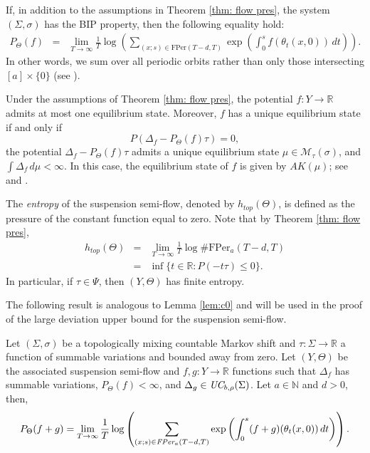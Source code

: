 \documentclass[letterpaper,11pt]{amsart}
\numberwithin{equation}{section}     %
\newcommand{\M}{\mathcal{M}}
\newcommand{\R}{\mathbb{R}}
\newcommand{\N}{\mathbb{N}}
\def\R{{\mathbb R}}
\def\N{{\mathbb N}}
\def\M{{\mathcal M}}
\def\M{\mathcal{M}}
\begin{document}
\begin{remark}\label{rmk:bipPer}

If, in addition to the assumptions in Theorem \ref{thm: flow pres}, the system $(\Sigma, \sigma)$ has the BIP property, then the following equality hold:
\begin{eqnarray*}
P_{\Theta}(f)&=&\lim_{T \to \infty} \frac{1}{T} \log \left(\sum_{(x;s)\in\text{FPer}(T-d,T)} \exp\left( \int_0^s f(\theta_t(x,0)) \,  dt \right) \right). \end{eqnarray*}
In other words, we sum over all periodic orbits rather than only those intersecting $[a] \times\{0\}$ (see \cite[Corollary 3.23]{jkl}).
\end{remark}

 Under the assumptions of Theorem \ref{thm: flow pres}, the potential 
$f:Y \to \R$ admits at most one equilibrium state. Moreover, $f$ has a 
unique equilibrium state if and only if 
\[
P(\Delta_f - P_{\Theta}(f)\tau) = 0,
\]
the potential $\Delta_f - P_{\Theta}(f)\tau$ admits a unique equilibrium state 
$\mu \in \M_{\tau}(\sigma)$, and $\int \Delta_f \, d\mu < \infty.$
In this case, the equilibrium state of $f$ is given by $AK(\mu)$; 
see \cite[Theorem~4]{bi} and \cite[Theorems~3.4 and 3.5]{ijt}.


The \emph{entropy} of the suspension semi-flow, denoted by $h_{top}(\Theta)$,  is defined as the pressure of the constant function equal to zero. Note that by Theorem \ref{thm: flow pres}, 
\begin{eqnarray*}
h_{top}(\Theta) &=&\lim_{T \to \infty} \frac{1}{T} \log \#\text{FPer}_a(T-d,T) \\
&=& \inf \{ t \in \R : P(-t \tau) \leq 0 \}.
\end{eqnarray*}
In particular, if $\tau\in\Psi$, then $(Y,\Theta)$  has finite entropy.

The following result is analogous to Lemma \ref{lem:c0} and will be used in the proof of the large deviation upper bound for the suspension semi-flow.

 
\begin{lemma}\label{lem:presC0} Let $(\Sigma, \sigma)$ be a topologically mixing countable Markov shift and $\tau:\Sigma \to \R$ a function of summable variations and bounded away from zero. Let $(Y, \Theta)$ be the associated suspension semi-flow and  $f, g: Y \to \R$  functions such that $\Delta_f$  has summable variations, $P_{\Theta}(f)<\infty$, and $\Delta_g\in \emph{UC}_{b,\rho}(\Sigma)$.  Let  $a\in\N$ and $d>0$, then,
\begin{align}\label{for:11}
P_{\Theta}(f+g) = \lim_{T \to \infty} \frac{1}{T} \log \left(\sum_{(x;s)\in \emph{FPer}_a(T-d,T)} \exp\left( \int_0^s (f+g)(\theta_t(x,0)) \, dt \right) \right).
 \end{align}
\end{lemma}
\end{document}
